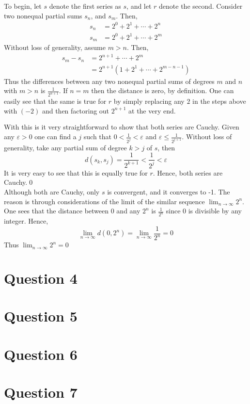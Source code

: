\documentclass[12pt, letterpaper]{article}
\begin{document}
\noindent To begin, let $s$ denote the first series as $s$, and let $r$ denote the second. Consider two nonequal partial sums $s_n$, and $s_m$. Then,
\begin{align*}
  s_n &= 2^0 + 2^1 + \cdots + 2^n \\
  s_m &= 2^0 + 2^1 + \cdots + 2^m
\end{align*}
Without loss of generality, assume $m > n$. Then,
\begin{align*}
  s_m - s_n &= 2^{n + 1} + \cdots + 2^m \\
  &= 2^{n + 1}(1 + 2^1 + \cdots + 2^{m - n - 1})
\end{align*}
Thus the differences between any two nonequal partial sums of degrees $m$ and $n$ with $m > n$ is $\frac{1}{2^{n+1}}$. If $n = m$ then the distance is zero, by definition.
One can easily see that the same is true for $r$ by simply replacing any $2$ in the steps above with $(-2)$ and then factoring out $2^{n+1}$ at the very end.
\par With this is it very straightforward to show that both series are
Cauchy. Given any $\varepsilon > 0$ one can find a $j$ such that $0 < \frac{1}{2^j} < \varepsilon$ and $\varepsilon \leq \frac{1}{2^{j + 1}}$.
Without loss of generality, take any partial sum of degree $k > j$ of $s$, then
$$d(s_k, s_j) = \frac{1}{2^{k + 1}} < \frac{1}{2^j} < \varepsilon$$
It is very easy to see that this is equally true for $r$. Hence, both series are Cauchy.\qed\\

\noindent Although both are Cauchy, only $s$ is convergent, and it converges to -1. The reason is through considerations of the limit of the similar sequence $\lim_{n\to\infty} 2^n$.
One sees that the distance between 0 and any $2^n$ is $\frac{1}{2^n}$ since 0 is divisible by any integer. Hence,
$$ \lim_{n\to\infty} d(0, 2^n) = \lim_{n\to\infty} \frac{1}{2^n} = 0$$
Thus $\lim_{n\to\infty} 2^n = 0$


\section*{Question 4}
\section*{Question 5}
\section*{Question 6}
\section*{Question 7}
\end{document}
